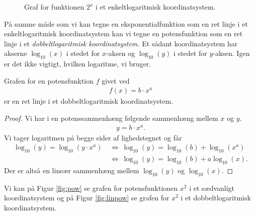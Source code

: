 \begin{figure}[H]
\begin{minipage}{0.48\textwidth}
{
 	}
 	\caption{Graf for funktionen $2^x$ i et enkeltlogaritmisk koordinatsystem.}
 	\label{fig:linexp}
	\end{minipage}
\end{figure}

På samme måde som vi kan tegne en eksponentialfunktion som en ret linje i et enkeltlogaritmisk koordinatsystem kan vi tegne en potensfunktion som en ret linje i et \textit{dobbeltlogaritmisk koordinatsystem.} Et sådant koordinatsystem har akserne $\log_{10}(x)$ i stedet for $x$-aksen og $\log_{10}(y)$ i stedet for $y$-aksen. Igen er det ikke vigtigt, hvilken logaritme, vi bruger.
\begin{setn}
	Grafen for en potensfunktion $f$ givet ved
	\begin{align*}
		f(x) = b\cdot x^a
	\end{align*}
	er en ret linje i et dobbeltlogaritmisk koordinatsystem.
\end{setn}
\begin{proof}
	Vi har i en potenssammenhæng følgende sammenhæng mellem $x$ og $y$.
	\begin{align*}
		y = b\cdot x^a.
	\end{align*}
	Vi tager logaritmen på begge sider af lighedstegnet og får
	\begin{align*}
	 	\log_{10}(y) = \log_{10}(y \cdot x^a) \ &\Leftrightarrow \ \log_{10}(y) = \log_{10}(b) + 
	 	\log_{10}(x^a) \\
	 	&\Leftrightarrow	 \ \log_{10}(y) = \log_{10}(b) + a \log_{10}(x).
	\end{align*}
	Der er altså en lineær sammenhæng mellem $\log_{10}(y)$ og $\log_{10}(x)$.
\end{proof}
Vi kan på Figur \ref{fig:pow} se grafen for potensfunktionen $x^2$ i et sædvanligt koordinatsystem og på Figur \ref{fig:linpow} se grafen for $x^2$ i et dobbeltlogaritmisk koordinatsystem. 

